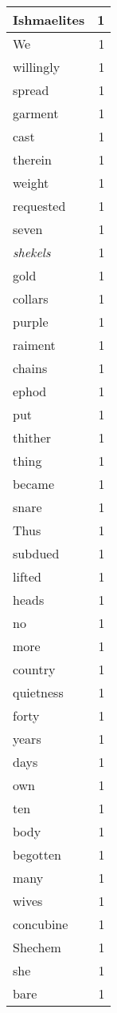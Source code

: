 \begin{center}
\begin{longtable}{l|r}
Ishmaelites & 1\\ \hline 
We & 1\\ \hline 
willingly & 1\\ \hline 
spread & 1\\ \hline 
garment & 1\\ \hline 
cast & 1\\ \hline 
therein & 1\\ \hline 
weight & 1\\ \hline 
requested & 1\\ \hline 
seven & 1\\ \hline 
\emph{shekels} & 1\\ \hline 
gold & 1\\ \hline 
collars & 1\\ \hline 
purple & 1\\ \hline 
raiment & 1\\ \hline 
chains & 1\\ \hline 
ephod & 1\\ \hline 
put & 1\\ \hline 
thither & 1\\ \hline 
thing & 1\\ \hline 
became & 1\\ \hline 
snare & 1\\ \hline 
Thus & 1\\ \hline 
subdued & 1\\ \hline 
lifted & 1\\ \hline 
heads & 1\\ \hline 
no & 1\\ \hline 
more & 1\\ \hline 
country & 1\\ \hline 
quietness & 1\\ \hline 
forty & 1\\ \hline 
years & 1\\ \hline 
days & 1\\ \hline 
own & 1\\ \hline 
ten & 1\\ \hline 
body & 1\\ \hline 
begotten & 1\\ \hline 
many & 1\\ \hline 
wives & 1\\ \hline 
concubine & 1\\ \hline 
Shechem & 1\\ \hline 
she & 1\\ \hline 
bare & 1\\ \hline 

\end{longtable}
\end{center}
